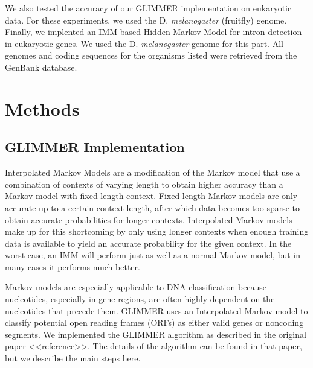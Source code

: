 \documentclass[11pt,letterpaper]{article}
\begin{document}
We also tested the accuracy of our GLIMMER implementation on eukaryotic data. For these experiments, we used the D. \emph{melanogaster} (fruitfly) genome. Finally, we implented an IMM-based Hidden Markov Model for intron detection in eukaryotic genes. We used the D. \emph{melanogaster} genome for this part. All genomes and coding sequences for the organisms listed were retrieved from the GenBank database.

\section{Methods}
\subsection{GLIMMER Implementation}

Interpolated Markov Models are a modification of the Markov model that use a combination of contexts of varying length to obtain higher accuracy than a Markov model with fixed-length context. Fixed-length Markov models are only accurate up to a certain context length, after which data becomes too sparse to obtain accurate probabilities for longer contexts. Interpolated Markov models make up for this shortcoming by only using longer contexts when enough training data is available to yield an accurate probability for the given context. In the worst case, an IMM will perform just as well as a normal Markov model, but in many cases it performs much better. 

Markov models are especially applicable to DNA classification because nucleotides, especially in gene regions, are often highly dependent on the nucleotides that precede them. GLIMMER uses an Interpolated Markov model to classify potential open reading frames (ORFs) as either valid genes or noncoding segments. We implemented the GLIMMER algorithm as described in the original paper <<reference>>. The details of the algorithm can be found in that paper, but we describe the main steps here.
\end{document}
